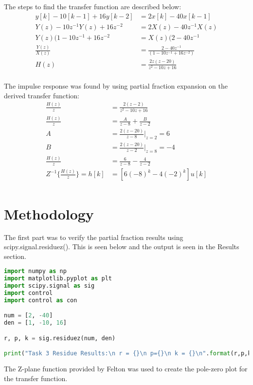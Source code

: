 \documentclass[12pt]{report}
\begin{document}
The steps to find the transfer function are described below:
    \begin{align*}
        y[k] - 10[k-1] + 16y[k-2] &= 2x[k] - 40x[k-1] \\
        Y(z) - 10z^{-1}Y(z) + 16z^{-2} &= 2X(z) - 40z^{-1}X(z) \\
        Y(z)(1 - 10z^{-1} + 16z^{-2} &= X(z)(2 - 40z^{-1} \\
        \frac{Y(z)}{X(z)} &= \frac{2 - 40z^{-1}}{(1-10z^{-1}+16z^{-2})} \\
        H(z) &=\frac{2z(z-20)}{z^2 - 10z + 16} \\
    \end{align*}

The impulse response was found by using partial fraction expansion on the derived transfer function:
    \begin{align*}
        \frac{H(z)}{z} &= \frac{2(z-2)}{z^2 - 10z +16} \\
        \frac{H(z)}{z} &= \frac{A}{z-8} + \frac{B}{z-2} \\
        A &= \frac{2(z-20)}{z-8}|_{z=2} = 6 \\
        B &= \frac{2(z-20)}{z-2}|_{z=8} = -4 \\
        \frac{H(z)}{z} &= \frac{6}{z-8} - \frac{4}{z-2} \\
        Z^{-1}\{\frac{H(z)}{z}\} = h[k] &= [6(-8)^k - 4(-2)^k]u[k] \\
    \end{align*}


\section{Methodology}
The first part was to verify the partial fraction results using scipy.signal.residuez(). This is seen below and the output is seen in the Results section.

\begin{lstlisting}[language=Python, caption= scipy.signal.residuez()]
import numpy as np
import matplotlib.pyplot as plt
import scipy.signal as sig
import control
import control as con

num = [2, -40]
den = [1, -10, 16]

r, p, k = sig.residuez(num, den)

print("Task 3 Residue Results:\n r = {}\n p={}\n k = {}\n".format(r,p,k))
\end{lstlisting}

The Z-plane function provided by Felton was used to create the pole-zero plot for the transfer function.
\end{document}
